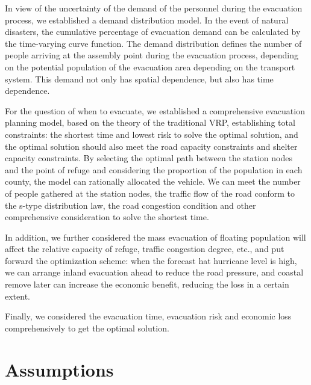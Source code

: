 \documentclass{mcmthesis}
\begin{document}
In view of the uncertainty of the demand of the personnel during the evacuation process, we established a demand distribution model. In the event of natural disasters, the cumulative percentage of evacuation demand can be calculated by the time-varying curve function. The demand distribution defines the number of people arriving at the assembly point during the evacuation process, depending on the potential population of the evacuation area depending on the transport system. This demand not only has spatial dependence, but also has time dependence.

For the question of when to evacuate, we established a comprehensive evacuation planning model, based on the theory of the traditional VRP, establishing total constraints: the shortest time and lowest risk to solve the optimal solution, and the optimal solution should also meet the road capacity constraints and shelter capacity constraints. By selecting the optimal path between the station nodes and the point of refuge and considering the proportion of the population in each county, the model can rationally allocated the vehicle. We can meet the number of people gathered at the station nodes, the traffic flow of the road conform to the s-type distribution law, the road congestion condition and other comprehensive consideration to solve the shortest time.

In addition, we further considered the mass evacuation of floating population will affect the relative capacity of refuge, traffic congestion degree, etc., and put forward the optimization scheme: when the forecast hat hurricane level is high, we can arrange inland evacuation ahead to reduce the road pressure, and coastal remove later can increase the economic benefit, reducing the loss in a certain extent.

Finally, we considered the evacuation time, evacuation risk and economic loss comprehensively to get the optimal solution.

\section{Assumptions}
\end{document}
